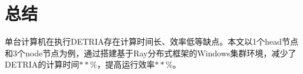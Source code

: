 \section{总结}

单台计算机在执行DETRIA存在计算时间长、效率低等缺点。本文以1个head节点和3个node节点为例，通过搭建基于Ray分布式框架的Windows集群环境，减少了DETRIA的计算时间$ **\% $，提高运行效率$ **\% $。